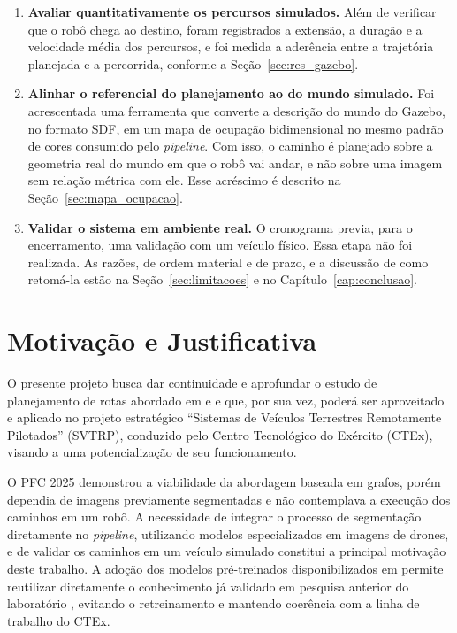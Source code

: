\documentclass[
    12pt,
    openright,
    oneside,
    a4paper,
    english,
    brazil
]{abntex2}
\begin{document}
\begin{enumerate}
    \item \textbf{Avaliar quantitativamente os percursos simulados.} Além de verificar que o robô chega ao destino, foram registrados a extensão, a duração e a velocidade média dos percursos, e foi medida a aderência entre a trajetória planejada e a percorrida, conforme a Seção~\ref{sec:res_gazebo}.

    \item \textbf{Alinhar o referencial do planejamento ao do mundo simulado.} Foi acrescentada uma ferramenta que converte a descrição do mundo do Gazebo, no formato SDF, em um mapa de ocupação bidimensional no mesmo padrão de cores consumido pelo \textit{pipeline}. Com isso, o caminho é planejado sobre a geometria real do mundo em que o robô vai andar, e não sobre uma imagem sem relação métrica com ele. Esse acréscimo é descrito na Seção~\ref{sec:mapa_ocupacao}.

    \item \textbf{Validar o sistema em ambiente real.} O cronograma previa, para o encerramento, uma validação com um veículo físico. Essa etapa não foi realizada. As razões, de ordem material e de prazo, e a discussão de como retomá-la estão na Seção~\ref{sec:limitacoes} e no Capítulo~\ref{cap:conclusao}.
\end{enumerate}

\section{Motivação e Justificativa}

O presente projeto busca dar continuidade e aprofundar o estudo de planejamento de rotas abordado em \cite{camelo2025} e \cite{junior2024} e que, por sua vez, poderá ser aproveitado e aplicado no projeto estratégico ``Sistemas de Veículos Terrestres Remotamente Pilotados'' (SVTRP), conduzido pelo Centro Tecnológico do Exército (CTEx), visando a uma potencialização de seu funcionamento.

O PFC 2025 demonstrou a viabilidade da abordagem baseada em grafos, porém dependia de imagens previamente segmentadas e não contemplava a execução dos caminhos em um robô. A necessidade de integrar o processo de segmentação diretamente no \textit{pipeline}, utilizando modelos especializados em imagens de drones, e de validar os caminhos em um veículo simulado constitui a principal motivação deste trabalho. A adoção dos modelos pré-treinados disponibilizados em \cite{junior2024_models} permite reutilizar diretamente o conhecimento já validado em pesquisa anterior do laboratório \cite{junior2024}, evitando o retreinamento e mantendo coerência com a linha de trabalho do CTEx.
\end{document}

